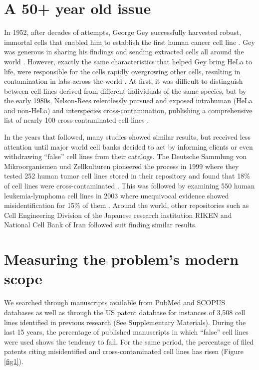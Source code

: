 \documentclass[12pt]{article}
\begin{document}
\section*{A 50+ year old issue}

In 1952, after decades of attempts, George Gey successfully harvested robust, immortal cells that enabled him to establish the first human cancer cell line \cite{gey1952tissue}. Gey was generous in sharing his findings and sending extracted cells all around the world \cite{culliton1974hela}. However, exactly the same characteristics that helped Gey bring HeLa to life, were responsible for the cells rapidly overgrowing other cells, resulting in contamination in labs across the world \cite{chatterjee2007cases}. At first, it was difficult to distinguish between cell lines derived from different individuals of the same species, but by the early 1980s, Nelson-Rees relentlessly pursued and exposed intrahuman (HeLa and non-HeLa) and interspecies cross-contamination, publishing a comprehensive list of nearly 100 cross-contaminated cell lines \cite{nelson1976hela, nelson1981cross}.

In the years that followed, many studies showed similar results, but received less attention until major world cell banks decided to act by informing clients or even withdrawing ``false'' cell lines from their catalogs. The Deutsche Sammlung von Mikroorganismen und Zellkulturen pioneered the process in 1999 where they tested 252 human tumor cell lines stored in their repository and found that 18\% of cell lines were cross-contaminated \cite{macleod1999widespread}. This was followed by examining 550 human leukemia-lymphoma cell lines in 2003 where unequivocal evidence showed misidentification for 15\% of them \cite{drexler2003false}. Around the world, other repositories such as Cell Engineering Division of the Japanese research institution RIKEN \cite{yoshino2006essential} and National Cell Bank of Iran \cite{azari2007profiling} followed suit finding similar results.

\section*{Measuring the problem's modern scope}
We searched through manuscripts available from PubMed and SCOPUS databases as well as through the US patent database for instances of 3,508 cell lines identified in previous research \cite{yu2015resource} (See Supplementary Materials). During the last 15 years, the percentage of published manuscripts in which ``false'' cell lines were used shows the tendency to fall. For the same period, the percentage of filed patents citing misidentified and cross-contaminated cell lines has risen (Figure \ref{fig1}).
\end{document}

